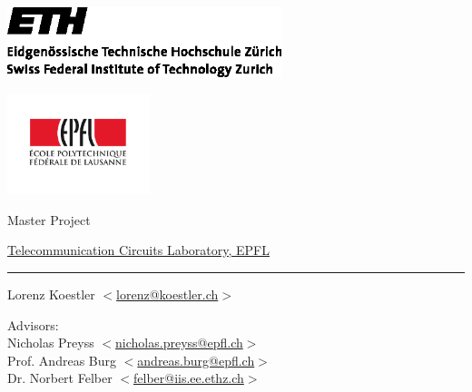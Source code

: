 \begin{center}

  \vspace*{-2cm}
  \begin{minipage}{\textwidth}
    \includegraphics[width=0.6\textwidth]{ethlogo}
    \hfill
    \raggedright
    \includegraphics[width=0.3108\textwidth]{epfl}
  \end{minipage}

  \vspace{3cm}

  \begin{flushright}
    {\LARGE Master Project}\\
    \vspace{5mm}

    \href{http://tcl.epfl.ch}{Telecommunication Circuits Laboratory, EPFL}


    \vspace{1.5cm} {\LARGE \bfseries \mytitle}
    \rule{\textwidth}{0.8mm}

    \vspace{2cm}

    Lorenz Koestler $ < $\href{mailto:lorenz@koestler.ch}{lorenz@koestler.ch}$ > $ \\

    \vspace{4cm}

    \myterm

    \vspace{2cm}
    Advisors: \\
    Nicholas Preyss $ < $\href{mailto:nicholas.preyss@epfl.ch}{nicholas.preyss@epfl.ch}$ > $ \\
    Prof. Andreas Burg $ < $\href{mailto:andreas.burg@epfl.ch}{andreas.burg@epfl.ch}$ > $ \\
    Dr. Norbert Felber $ < $\href{mailto:felber@iis.ee.ethz.ch}{felber@iis.ee.ethz.ch}$ > $ \\

  \end{flushright}
\end{center}
\newpage
